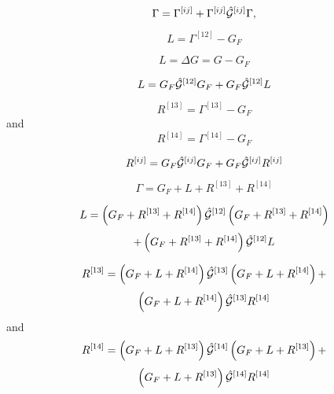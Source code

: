 {\[ 
      \Gamma= \Gamma^{[ij]}+\Gamma^{[ij]}\hat{{\cal G}}^{[ij]}\Gamma,
      \label{eq:generalchannel}
\]\vspace{1cm}

\[
    L=\Gamma^{[12]}-G_F
\]\vspace{1cm}

\[
    L=\Delta G =G-G_F
\]\vspace{1cm}

\[
    L=G_F\hat{{\cal G}}^{[12]}G_F+G_F\hat{{\cal G}}^{[12]}L
    \label{eq:ladder}
\]\vspace{1cm}

\[
    R^{[13]}=\Gamma^{[13]}-G_F
\]\vspace{1cm}
and 
\[
    R^{[14]}=\Gamma^{[14]}-G_F
\]\vspace{1cm}

\[
    R^{[ij]}=G_F\hat{{\cal G}}^{[ij]}G_F+G_F\hat{{\cal G}}^{[ij]}R^{[ij]}
    \label{eq:ring}
\]\vspace{1cm}

\[
    \Gamma=G_F+L+R^{[13]}+R^{[14]}
     \label{eq:gammap}
\]\vspace{1cm}

\[
    L=\left(G_F+R^{[13]}+R^{[14]}\right)\hat{{\cal G}}^{[12]}\left(G_F+R^{[13]}+R^{[14]}\right)\]\vspace{1cm}
\[
      +\left(G_F+R^{[13]}+R^{[14]}\right)\hat{{\cal G}}^{[12]}L
    \label{eq:laddernext}
\]\vspace{1cm}

\[
    R^{[13]}=\left(G_F+L+R^{[14]}\right)\hat{{\cal G}}^{[13]}
             \left(G_F+L+R^{[14]}\right) + \]\vspace{1cm}
\[
             \left(G_F+L+R^{[14]}\right)\hat{{\cal G}}^{[13]}R^{[14]}
    \label{eq:ring13next}
\]\vspace{1cm}
and
\[
    R^{[14]}=\left(G_F+L+R^{[13]}\right)\hat{{\cal G}}^{[14]}
             \left(G_F+L+R^{[13]}\right) + \]\vspace{1cm}
\[
             \left(G_F+L+R^{[13]}\right)\hat{{\cal G}}^{[14]}R^{[14]}
    \label{eq:ring14next}
\]\vspace{1cm}

}















